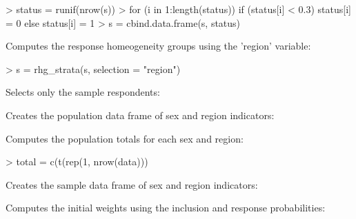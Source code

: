 \documentclass[a4paper]{article}
\begin{document}
\begin{Schunk}
\begin{Sinput}
> status = runif(nrow(s))
> for (i in 1:length(status)) if (status[i] < 0.3) status[i] = 0 else status[i] = 1
> s = cbind.data.frame(s, status)
\end{Sinput}
\end{Schunk}
Computes the response homeogeneity groups using the 'region' variable:

\begin{Schunk}
\begin{Sinput}
> s = rhg_strata(s, selection = "region")
\end{Sinput}
\end{Schunk}
Selects only the sample respondents:


\begin{Schunk}
\end{Schunk}
Creates the population data frame of sex and region indicators:

\begin{Schunk}
\end{Schunk}
Computes the population totals for each sex and region:

\begin{Schunk}
\begin{Sinput}
> total = c(t(rep(1, nrow(data))) %*% X)
\end{Sinput}
\end{Schunk}
Creates the sample data frame of sex and region indicators:

\begin{Schunk}
\end{Schunk}
Computes the initial weights using the inclusion and response probabilities:
\end{document}
